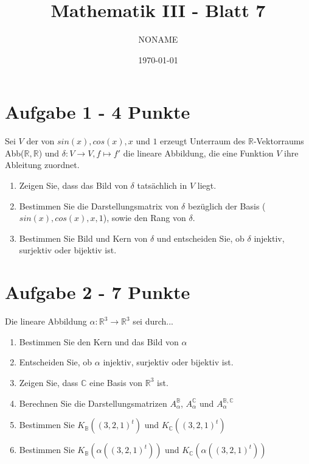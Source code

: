 \documentclass[a4paper]{article}
\author{NONAME}
\title{\vspace{-2cm}Mathematik III - Blatt 7}
\date{\today{}}
\begin{document}
        
\maketitle

\section*{Aufgabe 1 - 4 Punkte}
Sei $V$ der von $sin(x),cos(x),x$ und $1$ erzeugt Unterraum des $\mathbb{R}$-Vektorraums Abb($\mathbb{R},\mathbb{R}$) und $\delta: V \rightarrow V, f \mapsto f'$ die lineare Abbildung, die eine Funktion $V$ ihre Ableitung zuordnet.

   \begin{enumerate}[label=(\alph*)]
\item Zeigen Sie, dass das Bild von $\delta$ tatsächlich in $V$ liegt.
    \item Bestimmen Sie die Darstellungsmatrix von $\delta$ bezüglich der Basis ($sin(x),cos(x),x,1$), sowie den Rang von $\delta$.
    \item Bestimmen Sie Bild und Kern von $\delta$ und entscheiden Sie, ob $\delta$ injektiv, surjektiv oder bijektiv ist.
 \end{enumerate}
 

\section*{Aufgabe 2 - 7 Punkte}
Die lineare Abbildung $\alpha: \mathbb{R}^3 \rightarrow \mathbb{R}^3$ sei durch...

  \begin{enumerate}[label=(\alph*)]
\item Bestimmen Sie den Kern und das Bild von $\alpha$
    \item Entscheiden Sie, ob $\alpha$ injektiv, surjektiv oder bijektiv ist.
    \item Zeigen Sie, dass $\mathbb{C}$ eine Basis von $\mathbb{R}^3$ ist.
\item Berechnen Sie die Darstellungsmatrizen $A^{\mathbb{B}}_{\alpha}$, $A^{\mathbb{C}}_{\alpha}$ und $A^{\mathbb{B}, \mathbb{C}}_{\alpha}$
    \item Bestimmen Sie $K_{\mathbb{B}} ((3,2,1)^t)$ und $K_{\mathbb{C}} ((3,2,1)^t)$
    \item Bestimmen Sie $K_{\mathbb{B}} (\alpha((3,2,1)^t))$ und $K_{\mathbb{C}} (\alpha((3,2,1)^t))$
 \end{enumerate}
\end{document}
